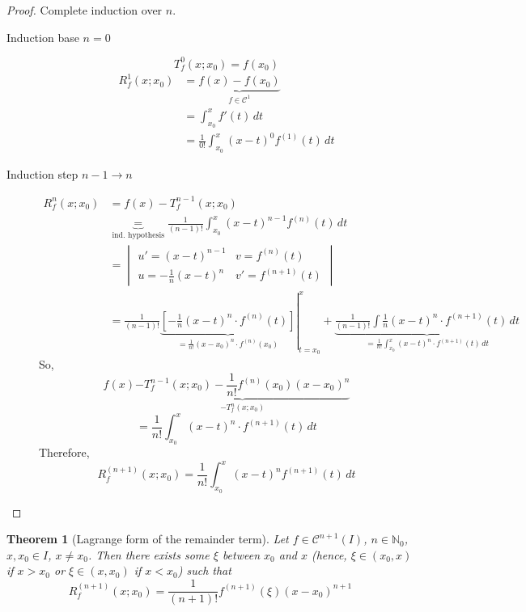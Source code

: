 \documentclass{article}
\newtheorem{theorem}{Theorem}  \numberwithin{theorem}{section}
\begin{document}
\begin{proof}
  Complete induction over $n$.
  \begin{description}
    \item[Induction base $n = 0$]
      \[ T_f^0(x; x_0) = f(x_0) \]
      \begin{align*}
        R_f^1(x; x_0) &= \underbrace{f(x) - f(x_0)}_{f \in \mathcal C^1} \\
          &= \int_{x_0}^x f'(t) \, dt \\
          &= \frac1{0!} \int_{x_0}^x (x - t)^0 f^{(1)}(t) \, dt
      \end{align*}
    \item[Induction step $n-1 \to n$]
      \begin{align*}
        R_f^n(x; x_0) &= f(x) - T_f^{n-1}(x; x_0) \\
          &\underbrace{=}_{\text{ind. hypothesis}} \frac{1}{(n-1)!} \int_{x_0}^x (x - t)^{n-1} f^{(n)}(t) \, dt \\
          &= \begin{vmatrix} u' = (x - t)^{n-1} & v = f^{(n)}(t) \\ u = -\frac1n (x - t)^n & v' = f^{(n+1)}(t) \end{vmatrix} \\
          &= \left.\frac{1}{(n-1)!} \underbrace{\left[-\frac1n (x - t)^n \cdot f^{(n)}(t)\right]}_{= \frac1{n!} (x - x_0)^n \cdot f^{(n)}(x_0)} \right|_{t = x_0}^{x} + \underbrace{\frac{1}{(n-1)!} \int \frac1n (x - t)^n \cdot f^{(n+1)}(t) \, dt}_{= \frac1{n!} \int_{x_0}^x (x - t)^n \cdot f^{(n+1)}(t) \, dt}
      \end{align*}
      So,
      \[ f(x) \underbrace{- T_f^{n-1}(x; x_0) - \frac{1}{n!} f^{(n)}(x_0)(x - x_0)^n}_{- T_f^n(x; x_0)} \]
      \[ = \frac1{n!} \int_{x_0}^x (x - t)^n \cdot f^{(n+1)}(t) \, dt \]
      Therefore,
      \[ R_f^{(n+1)}(x; x_0) = \frac{1}{n!} \int_{x_0}^x (x - t)^n f^{(n+1)}(t) \, dt \]
  \end{description}
\end{proof}

\begin{theorem}[Lagrange form of the remainder term] %
  \label{thm5}
  Let $f \in \mathcal C^{n+1}(I)$, $n \in \mathbb N_0$, $x, x_0 \in I$, $x \neq x_0$.
  Then there exists some $\xi$ between $x_0$ and $x$ (hence, $\xi \in (x_0, x)$ if $x > x_0$ or $\xi \in (x, x_0)$ if $x < x_0$) such that
  \[ R_f^{(n+1)}(x; x_0) = \frac{1}{(n+1)!} f^{(n+1)}(\xi) (x - x_0)^{n+1} \]
\end{theorem}
\end{document}
